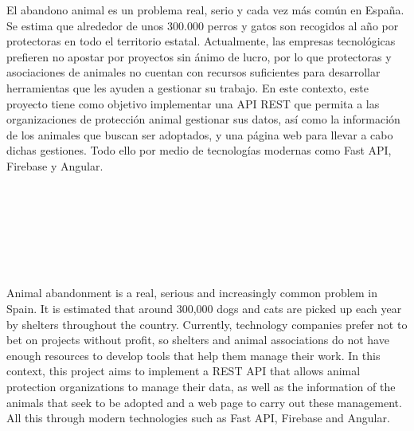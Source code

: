 \thispagestyle{empty}

\begin{center}
{\large\bfseries \myTitle}\\
\end{center}
\begin{center}
       \myName\\
\end{center}

\vspace{0.7cm}
\\

\vspace{0.7cm}
\\
\\
El abandono animal es un problema real, serio y cada vez más común en España. Se estima que alrededor de unos 300.000
perros y gatos son recogidos al año por protectoras en todo el territorio estatal. Actualmente, las empresas tecnológicas
prefieren no apostar por proyectos sin ánimo de lucro, por lo que protectoras y asociaciones de animales no cuentan con
recursos suficientes para desarrollar herramientas que les ayuden a gestionar su trabajo. En este contexto, este proyecto
tiene como objetivo implementar una API REST que permita a las organizaciones de protección animal gestionar sus datos,
así como la información de los animales que buscan ser adoptados, y una página web para llevar a cabo dichas gestiones.
Todo ello por medio de tecnologías modernas como Fast API, Firebase y Angular.
\cleardoublepage
\thispagestyle{empty}


\begin{center}
{\large\bfseries \myTitleEn}\\
\end{center}
\begin{center}
       \myName\\
\end{center}

\vspace{0.7cm}
\\

\vspace{0.7cm}
\\
\\
Animal abandonment is a real, serious and increasingly common problem in Spain. It is estimated that around 300,000 dogs
and cats are picked up each year by shelters throughout the country. Currently, technology companies prefer not to bet
on projects without profit, so shelters and animal associations do not have enough resources to develop tools that help
them manage their work. In this context, this project aims to implement a REST API that allows animal protection
organizations to manage their data, as well as the information of the animals that seek to be adopted and a web page
to carry out these management. All this through modern technologies such as Fast API, Firebase and Angular.

